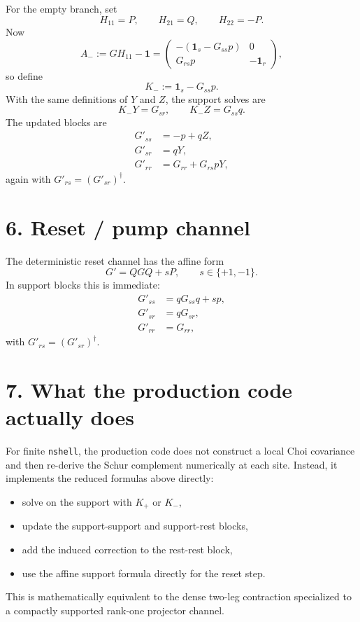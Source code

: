\documentclass[11pt]{article}
\newcommand{\I}{\mathbf{1}}
\begin{document}
For the empty branch, set
\begin{equation}
H_{11} = P, \qquad H_{21} = Q, \qquad H_{22} = -P.
\end{equation}
Now
\begin{equation}
A_- := GH_{11} - \I =
\begin{pmatrix}
-(\I_s - G_{ss}p) & 0 \\
G_{rs}p & -\I_r
\end{pmatrix},
\end{equation}
so define
\begin{equation}
K_- := \I_s - G_{ss}p.
\end{equation}
With the same definitions of $Y$ and $Z$, the support solves are
\begin{equation}
K_- Y = G_{sr},
\qquad
K_- Z = G_{ss}q.
\label{eq:kminus_solves}
\end{equation}
The updated blocks are
\begin{align}
G'_{ss} &= -p + qZ, \\
G'_{sr} &= qY, \\
G'_{rr} &= G_{rr} + G_{rs}pY,
\end{align}
again with $G'_{rs} = (G'_{sr})^\dagger$.

\section*{6. Reset / pump channel}

The deterministic reset channel has the affine form
\begin{equation}
G' = QGQ + sP,
\qquad
s \in \{+1,-1\}.
\end{equation}
In support blocks this is immediate:
\begin{align}
G'_{ss} &= q G_{ss} q + s p, \\
G'_{sr} &= q G_{sr}, \\
G'_{rr} &= G_{rr},
\end{align}
with $G'_{rs} = (G'_{sr})^\dagger$.

\section*{7. What the production code actually does}

For finite \texttt{nshell}, the production code does not construct a local Choi
covariance and then re-derive the Schur complement numerically at each site.
Instead, it implements the reduced formulas above directly:
\begin{itemize}
\item solve on the support with $K_+$ or $K_-$,
\item update the support-support and support-rest blocks,
\item add the induced correction to the rest-rest block,
\item use the affine support formula directly for the reset step.
\end{itemize}
This is mathematically equivalent to the dense two-leg contraction specialized to
a compactly supported rank-one projector channel.
\end{document}
